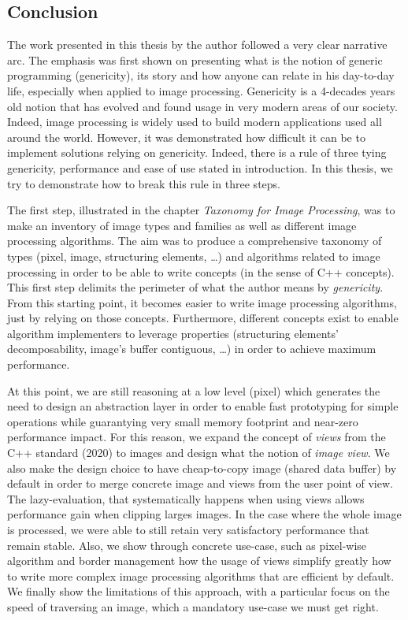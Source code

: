 \subsection*{Conclusion}


The work presented in this thesis by the author followed a very clear narrative arc. The emphasis was first shown on
presenting what is the notion of generic programming (genericity), its story and how anyone can relate in his day-to-day
life, especially when applied to image processing. Genericity is a 4-decades years old notion that has evolved and found
usage in very modern areas of our society. Indeed, image processing is widely used to build modern applications used all
around the world. However, it was demonstrated how difficult it can be to implement solutions relying on genericity.
Indeed, there is a rule of three tying genericity, performance and ease of use stated in introduction. In this thesis,
we try to demonstrate how to break this rule in three steps.

The first step, illustrated in the chapter \emph{Taxonomy for Image Processing}, was to make an inventory of image types
and families as well as different image processing algorithms. The aim was to produce a comprehensive taxonomy of types
(pixel, image, structuring elements, \ldots) and algorithms related to image processing in order to be able to write
concepts (in the sense of C++ concepts). This first step delimits the perimeter of what the author means by
\emph{genericity}. From this starting point, it becomes easier to write image processing algorithms, just by relying on
those concepts. Furthermore, different concepts exist to enable algorithm implementers to leverage properties
(structuring elements' decomposability, image's buffer contiguous, \ldots) in order to achieve maximum performance.

At this point, we are still reasoning at a low level (pixel) which generates the need to design an abstraction layer in
order to enable fast prototyping for simple operations while guarantying very small memory footprint and near-zero
performance impact. For this reason, we expand the concept of \emph{views} from the C++ standard (2020) to images and
design what the notion of \emph{image view}. We also make the design choice to have cheap-to-copy image (shared data
buffer) by default in order to merge concrete image and views from the user point of view. The lazy-evaluation, that
systematically happens when using views allows performance gain when clipping larges images. In the case where the whole
image is processed, we were able to still retain very satisfactory performance that remain stable. Also, we show through
concrete use-case, such as pixel-wise algorithm and border management how the usage of views simplify greatly how to
write more complex image processing algorithms that are efficient by default. We finally show the limitations of this
approach, with a particular focus on the speed of traversing an image, which a mandatory use-case we must get right.

